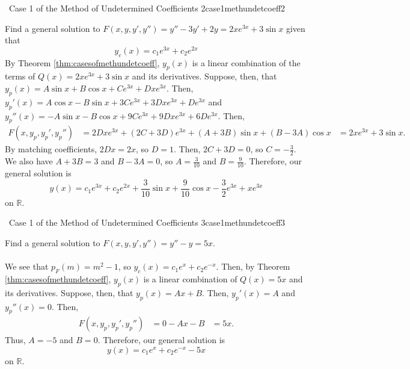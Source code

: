     \begin{example}{\Difficulty\,\Difficulty\,\,Case 1 of the Method of Undetermined Coefficients 2}{case1methundetcoeff2}
        
        Find a general solution to \(F(x,y,y',y'')=y''-3y'+2y=2xe^{3x}+3\sin x\) given that
        \begin{equation*}
            y_c(x)=c_1e^{3x}+c_2e^{2x}
        \end{equation*}
        By Theorem \ref{thm:casesofmethundetcoeff}, \(y_p(x)\) is a linear combination of the terms of \(Q(x)=2xe^{3x}+3\sin x\) and its derivatives. Suppose, then, that \(y_p(x)=A\sin x+B\cos x+Ce^{3x}+Dxe^{3x}\). Then, \(y_p'(x)=A\cos x-B\sin x+3Ce^{3x}+3Dxe^{3x}+De^{3x}\) and \(y_p''(x)=-A\sin x-B\cos x+9Ce^{3x}+9Dxe^{3x}+6De^{3x}\). Then,
        \begin{align*}
            F(x,y_p,y_p',y_p'')&=2Dxe^{3x}+(2C+3D)e^{3x}+(A+3B)\sin x+(B-3A)\cos x &= 2xe^{3x}+3\sin x.
        \end{align*}
        By matching coefficients, \(2Dx=2x\), so \(D=1\). Then, \(2C+3D=0\), so \(C=-\frac{3}{2}\). We also have \(A+3B=3\) and \(B-3A=0\), so \(A=\frac{3}{10}\) and \(B=\frac{9}{10}\). Therefore, our general solution is
        \begin{equation*}
            y(x)=c_1e^{3x}+c_2e^{2x}+\frac{3}{10}\sin x+\frac{9}{10}\cos x-\frac{3}{2}e^{3x}+xe^{3x}
        \end{equation*}
        on \(\mathbb{R}\).

    \end{example}
    \begin{example}{\Difficulty\,\Difficulty\,\,Case 1 of the Method of Undetermined Coefficients 3}{case1methundetcoeff3}
        
        Find a general solution to \(F(x,y,y',y'')=y''-y=5x\).
        \\
        \\
        We see that \(p_F(m)=m^2-1\), so \(y_c(x)=c_1e^x+c_2e^{-x}\). Then, by Theorem \ref{thm:casesofmethundetcoeff}, \(y_p(x)\) is a linear combination of \(Q(x)=5x\) and its derivatives. Suppose, then, that \(y_p(x)=Ax+B\). Then, \(y_p'(x)=A\) and \(y_p''(x)=0\). Then,
        \begin{align*}
            F(x,y_p,y_p',y_p'')&=0-Ax-B&=5x.
        \end{align*}
        Thus, \(A=-5\) and \(B=0\). Therefore, our general solution is
        \begin{equation*}
            y(x)=c_1e^x+c_2e^{-x}-5x
        \end{equation*}
        on \(\mathbb{R}\).

    \end{example}
